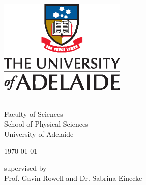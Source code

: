 \begin{titlepage}
\vspace*{-2cm}				%

\begin{center}
\makeatletter				%
\includegraphics[width=0.45\textwidth]{vertLogo.eps}\\[1.8cm]   	%

\vspace{0.6cm}							%
\LARGE{\@title}							%
\vspace{1.4cm}							%

\Large \@author	\\						%
\Large {Faculty of Sciences} \\			%
\Large {School of Physical Sciences} \\	%
\Large {University of Adelaide} 		%
\vspace{1.4cm}
	
\small \today							%

\vfill									%
\small {supervised by} \\
Prof. Gavin Rowell and Dr. Sabrina Einecke
\end{center}
\end{titlepage}


